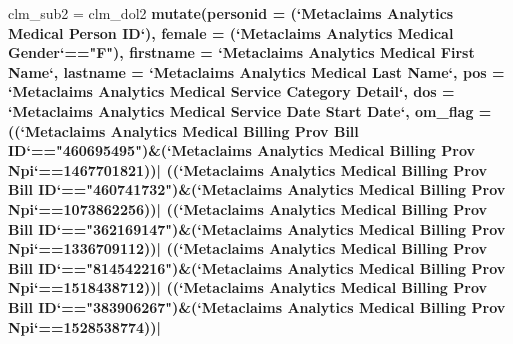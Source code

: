 \documentclass[]{article}
\newenvironment{Shaded}{\begin{snugshade}}{\end{snugshade}}
\newcommand{\KeywordTok}[1]{\textcolor[rgb]{0.13,0.29,0.53}{\textbf{#1}}}
\newcommand{\DataTypeTok}[1]{\textcolor[rgb]{0.13,0.29,0.53}{#1}}
\newcommand{\DecValTok}[1]{\textcolor[rgb]{0.00,0.00,0.81}{#1}}
\newcommand{\StringTok}[1]{\textcolor[rgb]{0.31,0.60,0.02}{#1}}
\newcommand{\OperatorTok}[1]{\textcolor[rgb]{0.81,0.36,0.00}{\textbf{#1}}}
\newcommand{\NormalTok}[1]{#1}
\begin{document}
\begin{Shaded}
\begin{Highlighting}[]
{\NormalTok{clm_sub2 =}\StringTok{ }\NormalTok{clm_dol2 }\OperatorTok{%>%}
\StringTok{  }\KeywordTok{mutate}\NormalTok{(}\DataTypeTok{personid =}\NormalTok{ (}\StringTok{`}\DataTypeTok{Metaclaims Analytics Medical Person ID}\StringTok{`}\NormalTok{),}
         \DataTypeTok{female =}\NormalTok{ (}\StringTok{`}\DataTypeTok{Metaclaims Analytics Medical Gender}\StringTok{`}\OperatorTok{==}\StringTok{"F"}\NormalTok{),}
         \DataTypeTok{firstname =} \StringTok{`}\DataTypeTok{Metaclaims Analytics Medical First Name}\StringTok{`}\NormalTok{,}
         \DataTypeTok{lastname =} \StringTok{`}\DataTypeTok{Metaclaims Analytics Medical Last Name}\StringTok{`}\NormalTok{,}
         \DataTypeTok{pos =} \StringTok{`}\DataTypeTok{Metaclaims Analytics Medical Service Category Detail}\StringTok{`}\NormalTok{,}
         \DataTypeTok{dos =} \StringTok{`}\DataTypeTok{Metaclaims Analytics Medical Service Date Start Date}\StringTok{`}\NormalTok{,}
         \DataTypeTok{om_flag =}\NormalTok{ ((}\StringTok{`}\DataTypeTok{Metaclaims Analytics Medical Billing Prov Bill ID}\StringTok{`}\OperatorTok{==}\StringTok{"460695495"}\NormalTok{)}\OperatorTok{&}\NormalTok{(}\StringTok{`}\DataTypeTok{Metaclaims Analytics Medical Billing Prov Npi}\StringTok{`}\OperatorTok{==}\DecValTok{1467701821}\NormalTok{))}\OperatorTok{|}
\StringTok{           }\NormalTok{((}\StringTok{`}\DataTypeTok{Metaclaims Analytics Medical Billing Prov Bill ID}\StringTok{`}\OperatorTok{==}\StringTok{"460741732"}\NormalTok{)}\OperatorTok{&}\NormalTok{(}\StringTok{`}\DataTypeTok{Metaclaims Analytics Medical Billing Prov Npi}\StringTok{`}\OperatorTok{==}\DecValTok{1073862256}\NormalTok{))}\OperatorTok{|}
\StringTok{           }\NormalTok{((}\StringTok{`}\DataTypeTok{Metaclaims Analytics Medical Billing Prov Bill ID}\StringTok{`}\OperatorTok{==}\StringTok{"362169147"}\NormalTok{)}\OperatorTok{&}\NormalTok{(}\StringTok{`}\DataTypeTok{Metaclaims Analytics Medical Billing Prov Npi}\StringTok{`}\OperatorTok{==}\DecValTok{1336709112}\NormalTok{))}\OperatorTok{|}
\StringTok{           }\NormalTok{((}\StringTok{`}\DataTypeTok{Metaclaims Analytics Medical Billing Prov Bill ID}\StringTok{`}\OperatorTok{==}\StringTok{"814542216"}\NormalTok{)}\OperatorTok{&}\NormalTok{(}\StringTok{`}\DataTypeTok{Metaclaims Analytics Medical Billing Prov Npi}\StringTok{`}\OperatorTok{==}\DecValTok{1518438712}\NormalTok{))}\OperatorTok{|}
\StringTok{           }\NormalTok{((}\StringTok{`}\DataTypeTok{Metaclaims Analytics Medical Billing Prov Bill ID}\StringTok{`}\OperatorTok{==}\StringTok{"383906267"}\NormalTok{)}\OperatorTok{&}\NormalTok{(}\StringTok{`}\DataTypeTok{Metaclaims Analytics Medical Billing Prov Npi}\StringTok{`}\OperatorTok{==}\DecValTok{1528538774}\NormalTok{))}\OperatorTok{|}
}}
\end{Highlighting}
\end{Shaded}
\end{document}
